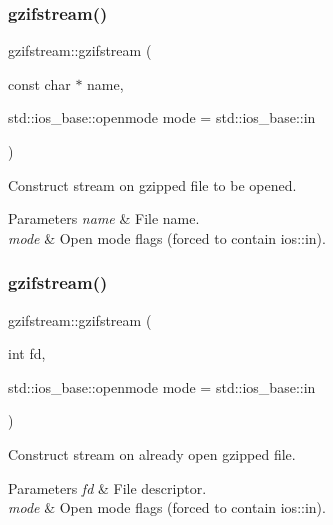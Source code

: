 \subsubsection{\texorpdfstring{gzifstream()}{gzifstream()}\hspace{0.1cm}{\footnotesize\ttfamily [3/4]}}
{\footnotesize\ttfamily gzifstream\+::gzifstream (\begin{DoxyParamCaption}\item[{const char $\ast$}]{name,  }\item[{std\+::ios\+\_\+base\+::openmode}]{mode = {\ttfamily std\+:\+:ios\+\_\+base\+:\+:in} }\end{DoxyParamCaption})\hspace{0.3cm}{\ttfamily [explicit]}}



Construct stream on gzipped file to be opened. 


\begin{DoxyParams}{Parameters}
{\em name} & File name. \\
\hline
{\em mode} & Open mode flags (forced to contain ios\+::in). \\
\hline
\end{DoxyParams}
\mbox{\label{classgzifstream_aa5ab9dcc3ab35bffe781f4c49239826e}} 
\subsubsection{\texorpdfstring{gzifstream()}{gzifstream()}\hspace{0.1cm}{\footnotesize\ttfamily [4/4]}}
{\footnotesize\ttfamily gzifstream\+::gzifstream (\begin{DoxyParamCaption}\item[{int}]{fd,  }\item[{std\+::ios\+\_\+base\+::openmode}]{mode = {\ttfamily std\+:\+:ios\+\_\+base\+:\+:in} }\end{DoxyParamCaption})\hspace{0.3cm}{\ttfamily [explicit]}}



Construct stream on already open gzipped file. 


\begin{DoxyParams}{Parameters}
{\em fd} & File descriptor. \\
\hline
{\em mode} & Open mode flags (forced to contain ios\+::in). \\
\hline
\end{DoxyParams}


